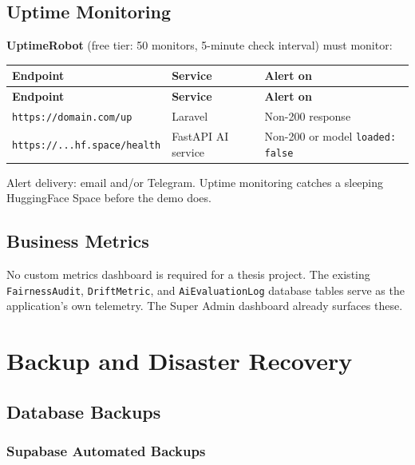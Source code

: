 \documentclass[12pt,a4paper]{report}
\begin{document}
\section{Uptime Monitoring}

\textbf{UptimeRobot} (free tier: 50 monitors, 5-minute check interval)
must monitor:

\begin{longtable}{L{5cm} L{4cm} L{4cm}}
    \toprule
    \textbf{Endpoint} & \textbf{Service} & \textbf{Alert on} \\
    \midrule
    \endfirsthead
    \toprule
    \textbf{Endpoint} & \textbf{Service} & \textbf{Alert on} \\
    \midrule
    \endhead
    \bottomrule
    \endlastfoot

    \texttt{https://domain.com/up} & Laravel & Non-200 response \\[4pt]
    \texttt{https://...hf.space/health} & FastAPI AI service &
        Non-200 or model \texttt{loaded: false} \\

\end{longtable}

Alert delivery: email and/or Telegram. Uptime monitoring catches a
sleeping HuggingFace Space before the demo does.

\section{Business Metrics}

No custom metrics dashboard is required for a thesis project. The
existing \texttt{FairnessAudit}, \texttt{DriftMetric}, and
\texttt{AiEvaluationLog} database tables serve as the application's
own telemetry. The Super Admin dashboard already surfaces these.

\chapter{Backup and Disaster Recovery}
\label{ch:backup}

\section{Database Backups}

\subsection{Supabase Automated Backups}
\end{document}
